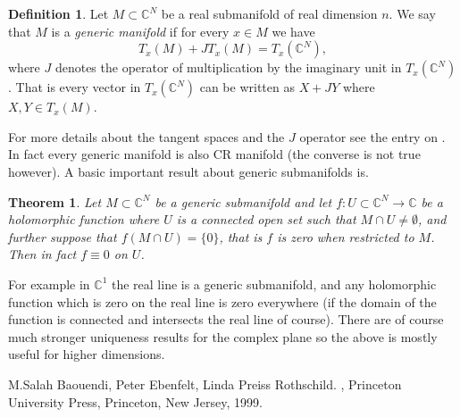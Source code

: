 \documentclass[12pt]{article}
\theoremstyle{theorem}
\newtheorem*{thm}{Theorem}
\theoremstyle{definition}
\newtheorem*{defn}{Definition}
\begin{document}
\begin{defn}
Let $M \subset {\mathbb{C}}^N$ be a real submanifold of real dimension $n$.  We say that $M$ is a {\em generic manifold} if for every $x \in M$ we have
\begin{equation*}
T_x(M) + JT_x(M) = T_x({\mathbb{C}}^N), 
\end{equation*}
where $J$ denotes the operator of multiplication by the imaginary unit in
$T_x({\mathbb{C}}^N)$.  That is every vector in
$T_x({\mathbb{C}}^N)$ can be written as $X + JY$ where $X, Y \in T_x(M)$.
\end{defn}

For more details about the tangent spaces and the $J$ operator see the
entry on
.  In fact every generic manifold is
also CR manifold (the converse is not true however).  A basic important result
about generic submanifolds is.

\begin{thm}
Let $M \subset {\mathbb{C}}^N$ be a generic submanifold and let
$f \colon U \subset {\mathbb{C}}^N \to {\mathbb{C}}$ be a holomorphic function
where $U$ is a connected open set such that $M \cap U \not= \emptyset$, and further
suppose that $f(M \cap U) = \{ 0 \}$, that is $f$ is zero when restricted
to $M$.  Then in fact $f \equiv 0$ on $U$.
\end{thm}

For example in ${\mathbb{C}}^1$ the real line is a generic submanifold, and any holomorphic function which is zero on the real line is zero everywhere (if the
domain of the function is connected and intersects the real line of course).  There are of course much stronger uniqueness results for the complex plane so the above is mostly useful for higher dimensions.

\begin{thebibliography}{9}
M.\@ Salah Baouendi,
Peter Ebenfelt,
Linda Preiss Rothschild.
{\em {}},
Princeton University Press,
Princeton, New Jersey, 1999.
\end{thebibliography}
\end{document}
